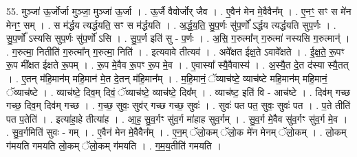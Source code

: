 \documentclass[17pt]{extarticle}
\begin{document}
55. मुञ्जा॑ ऊ॒र्जोर्जा मुञ्जा॒ मुञ्जा॑ ऊ॒र्जा । . ऊ॒र्जै वैवोर्जोर् जैव । . ए॒वैन॑ मेन मे॒वैवैन᳚म् । . ए॒नꣳ॒॒ सꣳ स मे॑न मेनꣳ॒॒ सम् । . स म॑र्द्धय त्यर्द्धयति॒ सꣳ स म॑र्द्धयति । . अ॒र्द्ध॒य॒ति॒ सु॒प॒र्णः सु॑प॒र्णो᳚ ऽर्द्धय त्यर्द्धयति सुप॒र्णः । . सु॒प॒र्णो᳚ ऽस्यसि सुप॒र्णः सु॑प॒र्णो॑ ऽसि । . सु॒प॒र्ण इति॑ सु - प॒र्णः । . अ॒सि॒ ग॒रुत्मा᳚न् ग॒रुत्मा॑ नस्यसि ग॒रुत्मान्॑ । . ग॒रुत्मा॒ नितीति॑ ग॒रुत्मा᳚न् ग॒रुत्मा॒ निति॑ । . इत्यवावे तीत्यव॑ । . अवे᳚क्षत ईक्ष॒ते ऽवावे᳚क्षते । . ई॒क्ष॒ते॒ रू॒पꣳ रू॒प मी᳚क्षत ईक्षते रू॒पम् । . रू॒प मे॒वैव रू॒पꣳ रू॒प मे॒व । . ए॒वास्या᳚ स्यै॒वैवास्य॑ । . अ॒स्यै॒त दे॒त द॑स्या स्यै॒तत् । . ए॒तन् म॑हि॒मान॑म् महि॒मान॑ मे॒त दे॒तन् म॑हि॒मान᳚म् । . म॒हि॒मानं॒ ॅव्याच॑ष्टे॒ व्याच॑ष्टे महि॒मान॑म् महि॒मानं॒ ॅव्याच॑ष्टे । . व्याच॑ष्टे॒ दिव॒म् दिवं॒ ॅव्याच॑ष्टे॒ व्याच॑ष्टे॒ दिव᳚म् । . व्याच॑ष्ट॒ इति॑ वि - आच॑ष्टे । . दिव॑म् गच्छ गच्छ॒ दिव॒म् दिव॑म् गच्छ । . ग॒च्छ॒ सुवः॒ सुव॑र् गच्छ गच्छ॒ सुवः॑ । . सुवः॑ पत पत॒ सुवः॒ सुवः॑ पत । . प॒ते तीति॑ पत प॒तेति॑ । . इत्या॑हा॒हे तीत्या॑ह । . आ॒ह॒ सु॒व॒र्गꣳ सु॑व॒र्ग मा॑हाह सुव॒र्गम् । . सु॒व॒र्ग मे॒वैव सु॑व॒र्गꣳ सु॑व॒र्ग मे॒व । . सु॒व॒र्गमिति॑ सुवः - गम् । . ए॒वैन॑ मेन मे॒वैवैन᳚म् । . ए॒न॒म् ॅलो॒कम् ॅलो॒क मे॑न मेनम् ॅलो॒कम् । . लो॒कम् ग॑मयति गमयति लो॒कम् ॅलो॒कम् ग॑मयति । . ग॒म॒य॒तीति॑ गमयति । \newline
\end{document}

